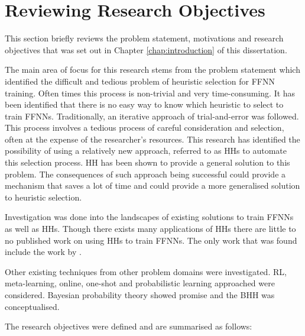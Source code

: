 \section{Reviewing Research Objectives}
\label{sec:conclusion:research_goals}

This section briefly reviews the problem statement, motivations and research objectives that was set out in Chapter \ref{chap:introduction} of this dissertation.

The main area of focus for this research stems from the problem statement which identified the difficult and tedious problem of heuristic selection for \ac{FFNN} training. Often times this process is non-trivial and very time-consuming. It has been identified that there is no easy way to know which heuristic to select to train \acp{FFNN}. Traditionally, an iterative approach of trial-and-error was followed. This process involves a tedious process of careful consideration and selection, often at the expense of the researcher's resources.  This research has identified the possibility of using a relatively new approach, referred to as \acp{HH} to automate this selection process. \ac{HH} has been shown to provide a general solution to this problem. The consequences of such approach being successful could provide a mechanism that saves a lot of time and could provide a more generalised solution to heuristic selection.

Investigation was done into the landscapes of existing solutions to train \acp{FFNN} as well as \acp{HH}. Though there exists many applications of \acp{HH} there are little to no published work on using \acp{HH} to train \acp{FFNN}. The only work that was found include the work by \citeauthor{ref:nel:2021} \cite{ref:nel:2021}. 

Other existing techniques from other problem domains were investigated. \ac{RL}, meta-learning, online, one-shot and probabilistic learning approached were considered. Bayesian probability theory showed promise and the \Ac{BHH} was conceptualised.

The research objectives were defined and are summarised as follows:

